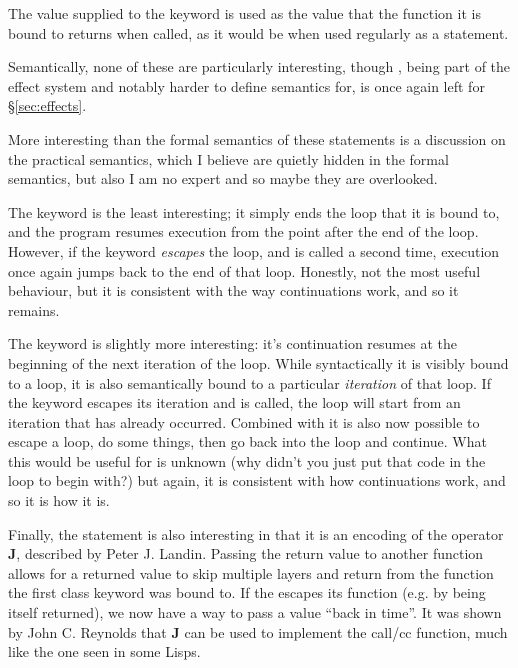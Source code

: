 The value supplied to the  keyword is used as the value that the function
it is bound to returns when called, as it would be when used regularly as a statement.

Semantically, none of these are particularly interesting, though , being
part of the effect system and notably harder to define semantics for, is once again
left for \S\ref{sec:effects}.

\begin{prooftree}
\end{prooftree}

\begin{prooftree}
\end{prooftree}

\begin{prooftree}
\end{prooftree}

More interesting than the formal semantics of these statements is a discussion on
the practical semantics, which I believe are quietly hidden in the formal semantics,
but also I am no expert and so maybe they are overlooked.

The  keyword is the least interesting; it simply ends the loop that it
is bound to, and the program resumes execution from the point after the end of the
loop. However, if the  keyword \emph{escapes} the loop, and is called
a second time, execution once again jumps back to the end of that loop. Honestly, not
the most useful behaviour, but it is consistent with the way continuations work, and
so it remains.

The  keyword is slightly more interesting: it's continuation resumes
at the beginning of the next iteration of the loop. While syntactically it is visibly
bound to a loop, it is also semantically bound to a particular \emph{iteration} of
that loop. If the  keyword escapes its iteration and is called,
the loop will start from an iteration that has already occurred. Combined with
 it is also now possible to escape a loop, do some things, then go back
into the loop and continue. What this would be useful for is unknown (why didn't
you just put that code in the loop to begin with?) but again, it is consistent with
how continuations work, and so it is how it is.

Finally, the  statement is also interesting in that it is an encoding of
the operator \textbf{J}, described by Peter J. Landin\cite{j}. Passing the return value
to another function allows for a returned value to skip multiple layers and return
from the function the first class keyword was bound to. If the  escapes
its function (e.g. by being itself returned), we now have a way to pass a value ``back
in time''. It was shown by John C. Reynolds that \textbf{J} can be used to implement
the call/cc function, much like the one seen in some Lisps\cite{defint}.
